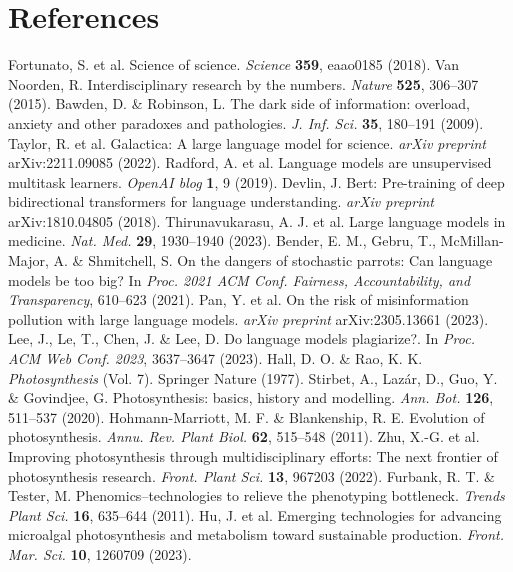 \documentclass[12pt]{article}
\begin{document}
\section{References}
\vspace{-1cm}
\renewcommand{\refname}{}
\begin{thebibliography}{39}
 Fortunato, S. et al. Science of science. \textit{Science} \textbf{359}, eaao0185 (2018).
 Van Noorden, R. Interdisciplinary research by the numbers. \textit{Nature} \textbf{525}, 306--307 (2015).
 Bawden, D. \& Robinson, L. The dark side of information: overload, anxiety and other paradoxes and pathologies. \textit{J. Inf. Sci.} \textbf{35}, 180--191 (2009).
 Taylor, R. et al. Galactica: A large language model for science. \textit{arXiv preprint} arXiv:2211.09085 (2022).
 Radford, A. et al. Language models are unsupervised multitask learners. \textit{OpenAI blog} \textbf{1}, 9 (2019).
 Devlin, J. Bert: Pre-training of deep bidirectional transformers for language understanding. \textit{arXiv preprint} arXiv:1810.04805 (2018).
 Thirunavukarasu, A. J. et al. Large language models in medicine. \textit{Nat. Med.} \textbf{29}, 1930--1940 (2023).
 Bender, E. M., Gebru, T., McMillan-Major, A. \& Shmitchell, S. On the dangers of stochastic parrots: Can language models be too big? In \textit{Proc. 2021 ACM Conf. Fairness, Accountability, and Transparency}, 610--623 (2021).
 Pan, Y. et al. On the risk of misinformation pollution with large language models. \textit{arXiv preprint} arXiv:2305.13661 (2023).
 Lee, J., Le, T., Chen, J. \& Lee, D. Do language models plagiarize?. In \textit{Proc. ACM Web Conf. 2023}, 3637--3647 (2023).
 Hall, D. O. \& Rao, K. K. \textit{Photosynthesis} (Vol. 7). Springer Nature (1977).
 Stirbet, A., Laz\'ar, D., Guo, Y. \& Govindjee, G. Photosynthesis: basics, history and modelling. \textit{Ann. Bot.} \textbf{126}, 511--537 (2020).
 Hohmann-Marriott, M. F. \& Blankenship, R. E. Evolution of photosynthesis. \textit{Annu. Rev. Plant Biol.} \textbf{62}, 515--548 (2011).
 Zhu, X.-G. et al. Improving photosynthesis through multidisciplinary efforts: The next frontier of photosynthesis research. \textit{Front. Plant Sci.} \textbf{13}, 967203 (2022).
 Furbank, R. T. \& Tester, M. Phenomics--technologies to relieve the phenotyping bottleneck. \textit{Trends Plant Sci.} \textbf{16}, 635--644 (2011).
 Hu, J. et al. Emerging technologies for advancing microalgal photosynthesis and metabolism toward sustainable production. \textit{Front. Mar. Sci.} \textbf{10}, 1260709 (2023).

\end{thebibliography}
\end{document}
